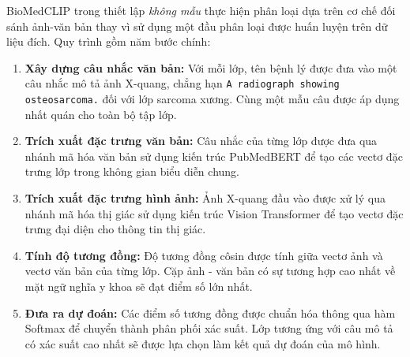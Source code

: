 BioMedCLIP trong thiết lập \textit{không mẫu} thực hiện phân loại dựa trên cơ chế đối sánh ảnh-văn bản thay vì sử dụng một đầu phân loại được huấn luyện trên dữ liệu đích. Quy trình gồm năm bước chính:

\begin{enumerate}
    \item \textbf{Xây dựng câu nhắc văn bản:} Với mỗi lớp, tên bệnh lý được đưa vào một câu nhắc mô tả ảnh X-quang, chẳng hạn \texttt{A radiograph showing osteosarcoma.} đối với lớp sarcoma xương. Cùng một mẫu câu được áp dụng nhất quán cho toàn bộ tập lớp.
    \item \textbf{Trích xuất đặc trưng văn bản:} Câu nhắc của từng lớp được đưa qua nhánh mã hóa văn bản sử dụng kiến trúc PubMedBERT để tạo các vectơ đặc trưng lớp trong không gian biểu diễn chung.
    \item \textbf{Trích xuất đặc trưng hình ảnh:} Ảnh X-quang đầu vào được xử lý qua nhánh mã hóa thị giác sử dụng kiến trúc Vision Transformer để tạo vectơ đặc trưng đại diện cho thông tin thị giác.
    \item \textbf{Tính độ tương đồng:} Độ tương đồng côsin được tính giữa vectơ ảnh và vectơ văn bản của từng lớp. Cặp ảnh - văn bản có sự tương hợp cao nhất về mặt ngữ nghĩa y khoa sẽ đạt điểm số lớn nhất.
    \item \textbf{Đưa ra dự đoán:} Các điểm số tương đồng được chuẩn hóa thông qua hàm Softmax để chuyển thành phân phối xác suất. Lớp tương ứng với câu mô tả có xác suất cao nhất sẽ được lựa chọn làm kết quả dự đoán của mô hình.
\end{enumerate}